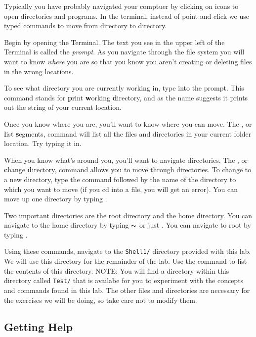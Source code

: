 Typically you have probably navigated your comptuer by clicking on icons to open directories and programs.
In the terminal, instead of point and click we use typed commands to move from directory to directory.

Begin by opening the Terminal. The text you see in the upper left of the Terminal is called the \emph{prompt}.
As you navigate through the file system you will want to know \emph{where} you are so that you know you aren't creating or deleting files in the wrong locations.

To see what directory you are currently working in, type  into the prompt.
This command stands for \textbf{p}rint \textbf{w}orking \textbf{d}irectory, and as the name suggests it prints out the string of your current location.

Once you know where you are, you'll want to know where you can move.
The , or \textbf{l}ist \textbf{s}egments, command will list all the files and directories in your current folder location.
Try typing it in.

When you know what's around you, you'll want to navigate directories.
The , or \textbf{c}hange \textbf{d}irectory, command allows you to move through directories.
To change to a new directory, type the  command followed by the name of the directory to which you want to move (if you cd into a file, you will get an error).
You can move up one directory by typing .

Two important directories are the root directory and the home directory.
You can navigate to the home directory by typing  $\thicksim$ or just .
You can navigate to root by typing .

\begin{problem}
Using these commands, navigate to the \texttt{Shell1/} directory provided with this lab. We will use this directory for the remainder of the lab. Use the  command to list the contents of this directory. NOTE: You will find a directory within this directory called \texttt{Test/} that is availabe for you to experiment with the concepts and commands found in this lab. The other files and directories are necessary for the exercises we will be doing, so take care not to modify them.
\end{problem}

\subsection*{Getting Help} %

